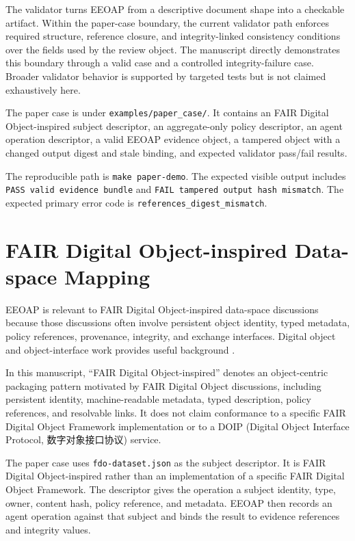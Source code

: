 \documentclass[11pt]{article}
\begin{document}
The validator turns EEOAP from a descriptive document shape into a checkable
artifact. Within the paper-case boundary, the current validator path enforces
required structure, reference closure, and integrity-linked consistency
conditions over the fields used by the review object. The manuscript directly
demonstrates this boundary through a valid case and a controlled
integrity-failure case. Broader validator behavior is supported by targeted
tests but is not claimed exhaustively here.

The paper case is under \texttt{examples/paper\_case/}. It contains an
FAIR Digital Object-inspired subject descriptor, an aggregate-only policy
descriptor, an agent operation descriptor, a valid EEOAP evidence object, a
tampered object with a changed output digest and stale binding, and expected
validator pass/fail results.

The reproducible path is \texttt{make paper-demo}. The expected visible output
includes \texttt{PASS valid evidence bundle} and \texttt{FAIL tampered output
hash mismatch}. The expected primary error code is
\texttt{references\_digest\_mismatch}.

\section{FAIR Digital Object-inspired Data-space Mapping}

EEOAP is relevant to FAIR Digital Object-inspired data-space discussions
because those discussions often involve persistent object identity, typed
metadata, policy references, provenance, integrity, and exchange interfaces.
Digital object and object-interface work provides useful background
\cite{doip,kahnwilensky}.

In this manuscript, ``FAIR Digital Object-inspired'' denotes an object-centric
packaging pattern motivated by FAIR Digital Object discussions, including
persistent identity, machine-readable metadata, typed description, policy
references, and resolvable links. It does not claim conformance to a specific
FAIR Digital Object Framework implementation or to a DOIP (Digital Object
Interface Protocol, 数字对象接口协议) service.

The paper case uses \texttt{fdo-dataset.json} as the subject descriptor. It is
FAIR Digital Object-inspired rather than an implementation of a specific FAIR
Digital Object Framework. The descriptor gives the operation a subject
identity, type, owner, content hash, policy reference, and metadata. EEOAP
then records an agent operation against that subject and binds the result to
evidence references and integrity values.
\end{document}
